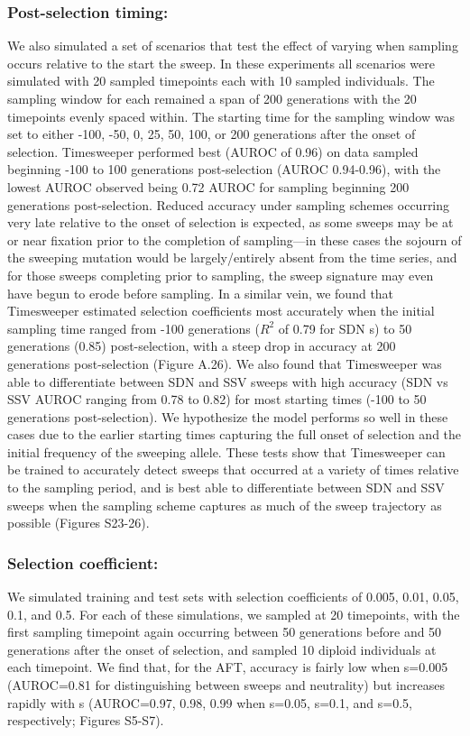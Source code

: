 \subsubsection{Post-selection timing:} We also simulated a set of scenarios that test the effect of varying when sampling occurs relative to the start the sweep. In these experiments all scenarios were simulated with 20 sampled timepoints each with 10 sampled individuals. The sampling window for each remained a span of 200 generations with the 20 timepoints evenly spaced within. The starting time for the sampling window was set to either -100, -50, 0, 25, 50, 100, or 200 generations after the onset of selection. Timesweeper performed best (AUROC of 0.96) on data sampled beginning -100 to 100 generations post-selection (AUROC 0.94-0.96), with the lowest AUROC observed being 0.72 AUROC for sampling beginning 200 generations post-selection. Reduced accuracy under sampling schemes occurring very late relative to the onset of selection is expected, as some sweeps may be at or near fixation prior to the completion of sampling—in these cases the sojourn of the sweeping mutation would be largely/entirely absent from the time series, and for those sweeps completing prior to sampling, the sweep signature may even have begun to erode before sampling. In a similar vein, we found that Timesweeper estimated selection coefficients most accurately when the initial sampling time ranged from -100 generations ($R^2$ of 0.79 for SDN s) to 50 generations (0.85) post-selection, with a steep drop in accuracy at 200 generations post-selection (Figure A.26).
We also found that Timesweeper was able to differentiate between SDN and SSV sweeps with high accuracy (SDN vs SSV AUROC ranging from 0.78 to 0.82) for most starting times (-100 to 50 generations post-selection). We hypothesize the model performs so well in these cases due to the earlier starting times capturing the full onset of selection and the initial frequency of the sweeping allele. These tests show that Timesweeper can be trained to accurately detect sweeps that occurred at a variety of times relative to the sampling period, and is best able to differentiate between SDN and SSV sweeps when the sampling scheme captures as much of the sweep trajectory as possible (Figures S23-26). \\

\subsubsection{Selection coefficient:} We simulated training and test sets with selection coefficients of 0.005, 0.01, 0.05, 0.1, and 0.5. For each of these simulations, we sampled at 20 timepoints, with the first sampling timepoint again occurring between 50 generations before and 50 generations after the onset of selection, and sampled 10 diploid individuals at each timepoint. We find that, for the AFT, accuracy is fairly low when s=0.005 (AUROC=0.81 for distinguishing between sweeps and neutrality) but increases rapidly with s (AUROC=0.97, 0.98, 0.99 when s=0.05, s=0.1, and s=0.5, respectively; Figures S5-S7).  \\

